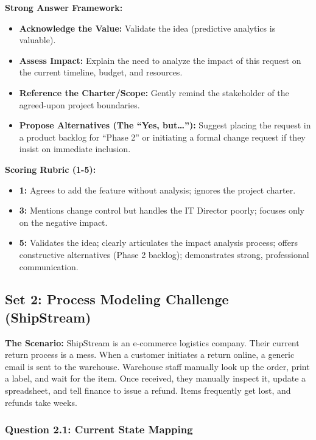 \documentclass[
  11pt,
  openany,
  oneside]{book}
\providecommand{\tightlist}{%
  \setlength{\itemsep}{0pt}\setlength{\parskip}{0pt}}
\begin{document}
\textbf{Strong Answer Framework:}

\begin{itemize}
\tightlist
\item
  \textbf{Acknowledge the Value:} Validate the idea (predictive
  analytics is valuable).
\item
  \textbf{Assess Impact:} Explain the need to analyze the impact of this
  request on the current timeline, budget, and resources.
\item
  \textbf{Reference the Charter/Scope:} Gently remind the stakeholder of
  the agreed-upon project boundaries.
\item
  \textbf{Propose Alternatives (The ``Yes, but\ldots{}''):} Suggest
  placing the request in a product backlog for ``Phase 2'' or initiating
  a formal change request if they insist on immediate inclusion.
\end{itemize}

\textbf{Scoring Rubric (1-5):}

\begin{itemize}
\tightlist
\item
  \textbf{1:} Agrees to add the feature without analysis; ignores the
  project charter.
\item
  \textbf{3:} Mentions change control but handles the IT Director
  poorly; focuses only on the negative impact.
\item
  \textbf{5:} Validates the idea; clearly articulates the impact
  analysis process; offers constructive alternatives (Phase 2 backlog);
  demonstrates strong, professional communication.
\end{itemize}

\bigskip

\subsection{Set 2: Process Modeling Challenge
(ShipStream)}\label{set-2-process-modeling-challenge-shipstream}

\textbf{The Scenario:} ShipStream is an e-commerce logistics company.
Their current return process is a mess. When a customer initiates a
return online, a generic email is sent to the warehouse. Warehouse staff
manually look up the order, print a label, and wait for the item. Once
received, they manually inspect it, update a spreadsheet, and tell
finance to issue a refund. Items frequently get lost, and refunds take
weeks.

\subsubsection{Question 2.1: Current State
Mapping}\label{question-2.1-current-state-mapping}
\end{document}
